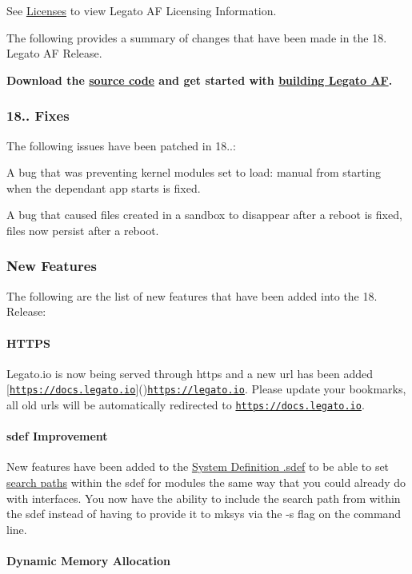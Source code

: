 See \hyperlink{aboutLicenses}{Licenses} to view Legato AF Licensing Information.

The following provides a summary of changes that have been made in the 18. Legato AF Release.

{\bfseries  Download the \hyperlink{aboutReleaseInfo}{source code} and get started with \hyperlink{basicBuild}{building Legato AF}. }\hypertarget{releaseNotes18051_Patches}{}\subsubsection{18.. Fixes}\label{releaseNotes18051_Patches}
The following issues have been patched in 18..\+:


\begin{DoxyItemize}
\item A bug that was preventing kernel modules set to {\ttfamily load\+:} {\ttfamily manual} from starting when the dependant app starts is fixed.
\item A bug that caused files created in a sandbox to disappear after a reboot is fixed, files now persist after a reboot.
\end{DoxyItemize}\hypertarget{releaseNotes18051__Features}{}\subsubsection{New Features}\label{releaseNotes18051__Features}
The following are the list of new features that have been added into the 18. Release\+:\hypertarget{releaseNotes18051_rn1805_Features_https}{}\paragraph{H\+T\+T\+PS}\label{releaseNotes18051_rn1805_Features_https}
Legato.\+io is now being served through https and a new url has been added \mbox{[}\href{https://docs.legato.io}{\tt https\+://docs.\+legato.\+io}\mbox{]}()\href{https://legato.io}{\tt https\+://legato.\+io}. Please update your bookmarks, all old urls will be automatically redirected to \href{https://docs.legato.io}{\tt https\+://docs.\+legato.\+io}.\hypertarget{releaseNotes18051_rn1805_Features_sdef}{}\paragraph{sdef Improvement}\label{releaseNotes18051_rn1805_Features_sdef}
New features have been added to the \hyperlink{defFilesSdef}{System Definition .sdef} to be able to set \hyperlink{defFilesSdef_defFilesSdef_searchPaths}{search paths} within the sdef for modules the same way that you could already do with interfaces. You now have the ability to include the search path from within the sdef instead of having to provide it to {\ttfamily mksys} via the {\ttfamily -\/s} flag on the command line.\hypertarget{releaseNotes18051_rn1805_Features_DynMemAll}{}\paragraph{Dynamic Memory Allocation}\label{releaseNotes18051_rn1805_Features_DynMemAll}
